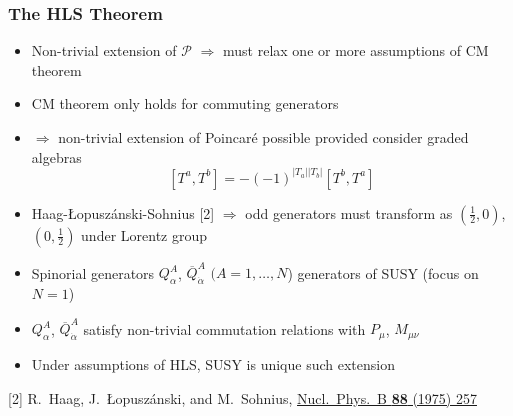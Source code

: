\documentclass[10pt,aspectratio=169]{beamer}
\begin{document}
\begin{frame}
  \frametitle{The HLS Theorem}
  \begin{itemize}\itemsep1em
  \item Non-trivial extension of $\mathcal{P}$ $\Rightarrow$ must
    relax one or more assumptions of CM theorem
  \item {\color{blue} CM theorem only holds for commuting generators}
  \item $\Rightarrow$ non-trivial extension of Poincar\'{e}
    possible provided consider graded algebras
    \begin{equation*}
      \left [ T^a , T^b \right ] = -(-1)^{|T_a||T_b|} \left [
        T^b, T^a \right ]
    \end{equation*}
  \item Haag-{\L}opusz\'{a}nski-Sohnius [2] $\Rightarrow$ odd
    generators must transform as $(\frac{1}{2}, 0)$, $(0, \frac{1}{2})$
    under Lorentz group
  \item Spinorial generators $Q^A_\alpha$, $\overline{Q}^A_{\dot{\alpha}}$
    $(A = 1, \ldots, N$) generators of SUSY (focus on $N = 1$)
  \item $Q^A_\alpha$, $\overline{Q}^A_{\dot{\alpha}}$ satisfy non-trivial
    commutation relations with $P_\mu$, $M_{\mu\nu}$
  \item {\color{blue} Under assumptions of HLS, SUSY is unique such
    extension}
  \end{itemize}
      {\tiny [2] R.~Haag, J.~{\L}opusz\'{a}nski, and M.~Sohnius,
        \href{http://dx.doi.org/10.1016/0550-3213(75)90279-5}{%
        Nucl.~Phys.~B \textbf{88} (1975) 257}}
\end{frame}
\end{document}
